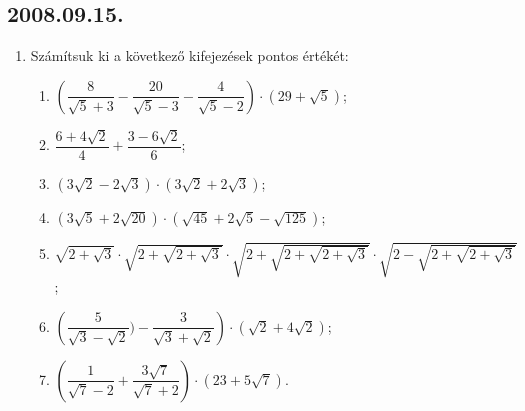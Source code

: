 \documentclass{article}
\newenvironment{abc}{\begin{enumerate}[label=\textit{\alph*})]}{\end{enumerate}}
\begin{document}
\subsection*{2008.09.15.}
\begin{enumerate}
\item Számítsuk ki a következő kifejezések pontos értékét:

\begin{abc}
\item  $\left(\dfrac{8}{\sqrt{5}+3}-\dfrac{20}{\sqrt{5}-3}-\dfrac{4}{\sqrt{5}-2}\right)\cdot(29+\sqrt{5})$;

\item   $\dfrac{6+4\sqrt{2}}{4}+\dfrac{3-6\sqrt{2}}{6}$;

\item   $(3\sqrt{2}-2\sqrt{3})\cdot(3\sqrt{2}+2\sqrt{3})$;

\item   $(3\sqrt{5}+2\sqrt{20})\cdot (\sqrt{45}+2\sqrt{5}-\sqrt{125})$;

\item   $\sqrt{2+\sqrt{3}}\cdot \sqrt{2+\sqrt{2+\sqrt{3}}}\cdot \sqrt{2+\sqrt{2+\sqrt{2+\sqrt{3}}}}\cdot \sqrt{2-\sqrt{2+\sqrt{2+\sqrt{3}}}}$ ;

\item   $\left(\dfrac{5}{\sqrt{3}-\sqrt{2}})-\dfrac{3}{\sqrt{3}+\sqrt{2}}\right)\cdot(\sqrt{2}+4\sqrt{2})$;

\item   $\left(\dfrac{1}{\sqrt{7}-2}+\dfrac{3\sqrt{7}}{\sqrt{7}+2}\right)\cdot(23+5\sqrt{7})$.
\end{abc}
\end{enumerate}
\end{document}
